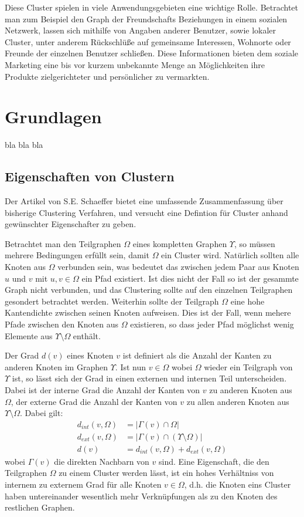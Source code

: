 \documentclass[journal]{vgtc}
\begin{document}
  Diese Cluster spielen in viele Anwendungsgebieten eine wichtige Rolle. 
  Betrachtet man zum Beispiel den Graph der Freundschafts Beziehungen in einem sozialen Netzwerk,
  lassen sich mithilfe von Angaben anderer Benutzer, sowie lokaler Cluster, unter anderem Rückschlüße 
  auf gemeinsame Interessen, Wohnorte oder Freunde der einzelnen Benutzer schließen.
  Diese Informationen bieten dem soziale Marketing eine bis vor kurzem unbekannte Menge
  an Möglichkeiten ihre Produkte zielgerichteter und persönlicher zu vermarkten.

\section{Grundlagen}
  
  bla bla bla
  
  \subsection{Eigenschaften von Clustern}
  \label{sec:properties} 
  Der Artikel von S.E. Schaeffer \cite{Schaeffer} bietet eine umfassende Zusammenfassung
  über bisherige Clustering Verfahren, und versucht eine Defintion für 
  Cluster anhand gewünschter Eigenschafter zu geben.
  
  Betrachtet man den Teilgraphen $\Omega$ eines kompletten Graphen $\Upsilon$, so müssen
  mehrere Bedingungen erfüllt sein, damit $\Omega$ ein Cluster wird.
  Natürlich sollten alle Knoten aus $\Omega$ verbunden sein, was bedeutet das 
  zwischen jedem Paar aus Knoten $u$ und $v$ mit $u,v \in \Omega$ ein Pfad existiert. 
  Ist dies nicht der Fall so ist der gesammte Graph nicht verbunden, und das 
  Clustering sollte auf den einzelnen Teilgraphen gesondert betrachtet werden.
  Weiterhin sollte der Teilgraph $\Omega$ eine hohe Kantendichte zwischen seinen Knoten
  aufweisen. Dies ist der Fall, wenn mehere Pfade zwischen den Knoten aus $\Omega$ existieren,
  so dass jeder Pfad möglichst wenig Elemente aus $\Upsilon \setminus \Omega$ enthält.
  
  Der Grad $d(v)$ eines Knoten $v$ ist definiert als die Anzahl der Kanten zu anderen Knoten im
  Graphen $\Upsilon$. Ist nun $v \in \Omega$ wobei $\Omega$ wieder ein Teilgraph von $\Upsilon$
  ist, so lässt sich der Grad in einen externen und internen Teil unterscheiden. Dabei
  ist der interne Grad die Anzahl der Kanten von $v$ zu anderen Knoten aus $\Omega$, der externe
  Grad die Anzahl der Kanten von $v$ zu allen anderen Knoten aus $\Upsilon \setminus \Omega$.
  Dabei gilt:
    \begin{align}
      d_{int}(v, \Omega) &= |\Gamma(v) \cap \Omega |\\
      d_{ext}(v, \Omega) &= |\Gamma(v) \cap (\Upsilon \setminus \Omega) | \\
      d(v) &= d_{int}(v, \Omega) + d_{ext}(v, \Omega)
    \end{align}
  wobei $\Gamma(v)$ die direkten Nachbarn von $v$ sind.
  Eine Eigenschaft, die den Teilgraphen $\Omega$ zu einem Cluster werden lässt, ist ein hohes
  Verhältniss von internem zu externem Grad für alle Knoten $v \in \Omega$, d.h. die Knoten eins 
  Cluster haben untereinander wesentlich mehr Verknüpfungen als zu den Knoten des restlichen Graphen.
   
\end{document}
